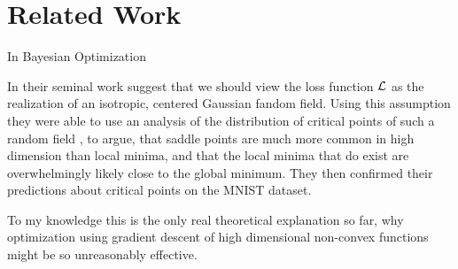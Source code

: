 \section{Related Work}

In Bayesian Optimization \parencite[e.g.][]{frazierBayesianOptimization2018}

In their seminal work 
\textcite{dauphinIdentifyingAttackingSaddle2014} suggest that we
should view the loss function \(\mathcal{L}\) as the realization of an isotropic,
centered Gaussian fandom field. Using this assumption they were able to use an
analysis of the distribution of critical points of such a random field
\parencite{brayStatisticsCriticalPoints2007}, to argue, that saddle points are
much more common in high dimension than local minima, and that the local minima
that do exist are overwhelmingly likely close to the global minimum. They
then confirmed their predictions about critical points on the MNIST dataset.

To my knowledge this is the only real theoretical explanation so far, why
optimization using gradient descent of high dimensional non-convex functions
might be so unreasonably effective.

